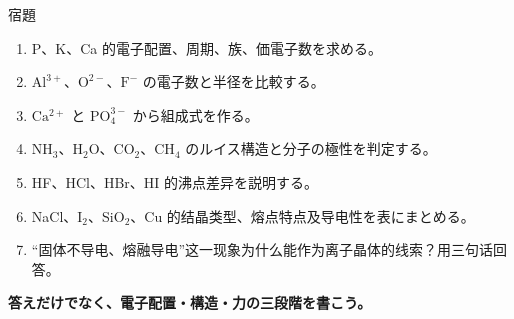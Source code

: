 \documentclass[notheorems,aspectratio=169]{beamer}
\newcommand{\jp}[1]{\textbf{\color{JapanBlue}#1}}
\begin{document}
\begin{frame}{宿題}
\small
\begin{enumerate}
  \item P、K、Ca 的電子配置、周期、族、価電子数を求める。
  \item $\mathrm{Al^{3+}}$、$\mathrm{O^{2-}}$、$\mathrm{F^-}$ の電子数と半径を比較する。
  \item $\mathrm{Ca^{2+}}$ と $\mathrm{PO_4^{3-}}$ から組成式を作る。
  \item NH$_3$、H$_2$O、CO$_2$、CH$_4$ のルイス構造と分子の極性を判定する。
  \item HF、HCl、HBr、HI 的沸点差异を説明する。
  \item NaCl、I$_2$、SiO$_2$、Cu 的结晶类型、熔点特点及导电性を表にまとめる。
  \item “固体不导电、熔融导电”这一现象为什么能作为离子晶体的线索？用三句话回答。
\end{enumerate}
\vfill
\centering\jp{答えだけでなく、電子配置・構造・力の三段階を書こう。}
\end{frame}
\end{document}
